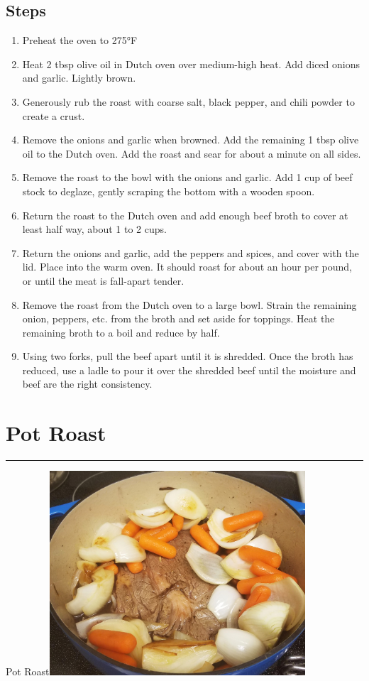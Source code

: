 \documentclass[11pt,]{article}
\begin{document}
\subsection{Steps}\label{steps-4}

\begin{enumerate}
\def\labelenumi{\arabic{enumi}.}
\item
  Preheat the oven to 275°F
\item
  Heat 2 tbsp olive oil in Dutch oven over medium-high heat. Add diced
  onions and garlic. Lightly brown.
\item
  Generously rub the roast with coarse salt, black pepper, and chili
  powder to create a crust.
\item
  Remove the onions and garlic when browned. Add the remaining 1 tbsp
  olive oil to the Dutch oven. Add the roast and sear for about a minute
  on all sides.
\item
  Remove the roast to the bowl with the onions and garlic. Add 1 cup of
  beef stock to deglaze, gently scraping the bottom with a wooden spoon.
\item
  Return the roast to the Dutch oven and add enough beef broth to cover
  at least half way, about 1 to 2 cups.
\item
  Return the onions and garlic, add the peppers and spices, and cover
  with the lid. Place into the warm oven. It should roast for about an
  hour per pound, or until the meat is fall-apart tender.
\item
  Remove the roast from the Dutch oven to a large bowl. Strain the
  remaining onion, peppers, etc. from the broth and set aside for
  toppings. Heat the remaining broth to a boil and reduce by half.
\item
  Using two forks, pull the beef apart until it is shredded. Once the
  broth has reduced, use a ladle to pour it over the shredded beef until
  the moisture and beef are the right consistency.
\end{enumerate}

\break 

\section{Pot Roast}\label{pot-roast}

\hrule  \vspace{5 mm}

\HUGE Pot
Roast\normalsize \hfill \includegraphics[align=c, height=3in]{recipes/Pot Roast/pot_roast.jpg}
\end{document}
